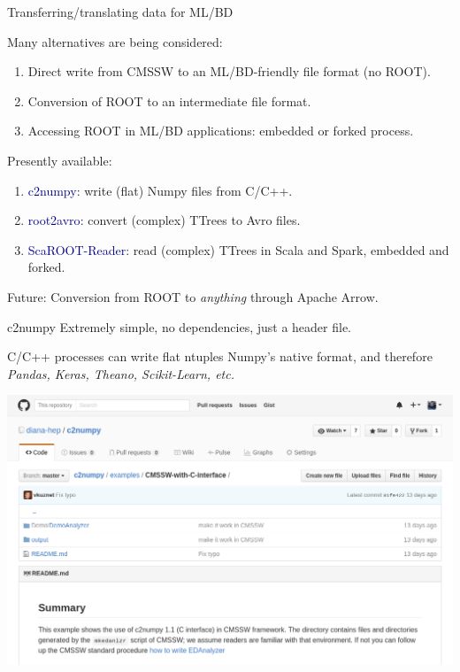 \documentclass{beamer}
\begin{document}
\begin{frame}{Transferring/translating data for ML/BD}
\vspace{0.5 cm}
\begin{block}{Many alternatives are being considered:}
\begin{enumerate}
\item Direct write from CMSSW to an ML/BD-friendly file format (no ROOT).
\item Conversion of ROOT to an intermediate file format.
\item Accessing ROOT in ML/BD applications: embedded or forked process.
\end{enumerate}
\end{block}

\vspace{-0.25 cm}
\begin{block}{Presently available:}
\begin{enumerate}
\item \textcolor{darkblue}{c2numpy}: write (flat) Numpy files from C/C++.
\item \textcolor{darkblue}{root2avro}: convert (complex) TTrees to Avro files.
\item \textcolor{darkblue}{ScaROOT-Reader}: read (complex) TTrees in Scala and Spark, embedded and forked.
\end{enumerate}
\end{block}

\vspace{-0.25 cm}
\begin{block}{Future:}
Conversion from ROOT to {\it anything} through Apache Arrow.
\end{block}
\end{frame}

\begin{frame}{c2numpy}
\vspace{0.5 cm}
Extremely simple, no dependencies, just a header file.

\vspace{0.25 cm}
C/C++ processes can write flat ntuples Numpy's native format, and therefore {\it Pandas, Keras, Theano, Scikit-Learn, etc.}

\begin{center}
\includegraphics[width=0.9\linewidth]{c2numpy.png}
\end{center}
\end{frame}
\end{document}
